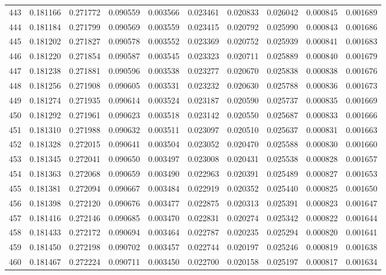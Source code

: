 \begin{tabular}{lrrrrrrrrr}
443 & 0.181166 & 0.271772 & 0.090559 & 0.003566 & 0.023461 & 0.020833 & 0.026042 & 0.000845 & 0.001689 \\
444 & 0.181184 & 0.271799 & 0.090569 & 0.003559 & 0.023415 & 0.020792 & 0.025990 & 0.000843 & 0.001686 \\
445 & 0.181202 & 0.271827 & 0.090578 & 0.003552 & 0.023369 & 0.020752 & 0.025939 & 0.000841 & 0.001683 \\
446 & 0.181220 & 0.271854 & 0.090587 & 0.003545 & 0.023323 & 0.020711 & 0.025889 & 0.000840 & 0.001679 \\
447 & 0.181238 & 0.271881 & 0.090596 & 0.003538 & 0.023277 & 0.020670 & 0.025838 & 0.000838 & 0.001676 \\
448 & 0.181256 & 0.271908 & 0.090605 & 0.003531 & 0.023232 & 0.020630 & 0.025788 & 0.000836 & 0.001673 \\
449 & 0.181274 & 0.271935 & 0.090614 & 0.003524 & 0.023187 & 0.020590 & 0.025737 & 0.000835 & 0.001669 \\
450 & 0.181292 & 0.271961 & 0.090623 & 0.003518 & 0.023142 & 0.020550 & 0.025687 & 0.000833 & 0.001666 \\
451 & 0.181310 & 0.271988 & 0.090632 & 0.003511 & 0.023097 & 0.020510 & 0.025637 & 0.000831 & 0.001663 \\
452 & 0.181328 & 0.272015 & 0.090641 & 0.003504 & 0.023052 & 0.020470 & 0.025588 & 0.000830 & 0.001660 \\
453 & 0.181345 & 0.272041 & 0.090650 & 0.003497 & 0.023008 & 0.020431 & 0.025538 & 0.000828 & 0.001657 \\
454 & 0.181363 & 0.272068 & 0.090659 & 0.003490 & 0.022963 & 0.020391 & 0.025489 & 0.000827 & 0.001653 \\
455 & 0.181381 & 0.272094 & 0.090667 & 0.003484 & 0.022919 & 0.020352 & 0.025440 & 0.000825 & 0.001650 \\
456 & 0.181398 & 0.272120 & 0.090676 & 0.003477 & 0.022875 & 0.020313 & 0.025391 & 0.000823 & 0.001647 \\
457 & 0.181416 & 0.272146 & 0.090685 & 0.003470 & 0.022831 & 0.020274 & 0.025342 & 0.000822 & 0.001644 \\
458 & 0.181433 & 0.272172 & 0.090694 & 0.003464 & 0.022787 & 0.020235 & 0.025294 & 0.000820 & 0.001641 \\
459 & 0.181450 & 0.272198 & 0.090702 & 0.003457 & 0.022744 & 0.020197 & 0.025246 & 0.000819 & 0.001638 \\
460 & 0.181467 & 0.272224 & 0.090711 & 0.003450 & 0.022700 & 0.020158 & 0.025197 & 0.000817 & 0.001634 \\

\end{tabular}
